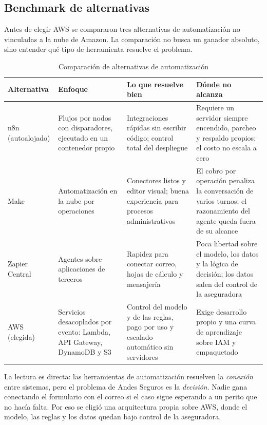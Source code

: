 \documentclass[12pt,letterpaper]{article}
\begin{document}
\subsection{Benchmark de alternativas}

Antes de elegir AWS se compararon tres alternativas de automatización no vinculadas a la
nube de Amazon. La comparación no busca un ganador absoluto, sino entender qué tipo de
herramienta resuelve el problema.

\begin{table}[H]
\centering
\caption{Comparación de alternativas de automatización}
\label{tab:benchmark}
\small
\begin{tabular}{p{2.5cm}p{3.4cm}p{3.6cm}p{4.2cm}}
\toprule
\textbf{Alternativa} & \textbf{Enfoque} & \textbf{Lo que resuelve bien} & \textbf{Dónde no alcanza} \\
\midrule
n8n (autoalojado) &
Flujos por nodos con disparadores, ejecutado en un contenedor propio &
Integraciones rápidas sin escribir código; control total del despliegue &
Requiere un servidor siempre encendido, parcheo y respaldo propios; el costo no escala a cero \\
\addlinespace
Make &
Automatización en la nube por operaciones &
Conectores listos y editor visual; buena experiencia para procesos administrativos &
El cobro por operación penaliza la conversación de varios turnos; el razonamiento del agente queda fuera de su alcance \\
\addlinespace
Zapier Central &
Agentes sobre aplicaciones de terceros &
Rapidez para conectar correo, hojas de cálculo y mensajería &
Poca libertad sobre el modelo, los datos y la lógica de decisión; los datos salen del control de la aseguradora \\
\addlinespace
AWS (elegida) &
Servicios desacoplados por evento: Lambda, API Gateway, DynamoDB y S3 &
Control del modelo y de las reglas, pago por uso y escalado automático sin servidores &
Exige desarrollo propio y una curva de aprendizaje sobre IAM y empaquetado \\
\bottomrule
\end{tabular}
\end{table}

La lectura es directa: las herramientas de automatización resuelven la \emph{conexión}
entre sistemas, pero el problema de Andes Seguros es la \emph{decisión}. Nadie gana
conectando el formulario con el correo si el caso sigue esperando a un perito que no hacía
falta. Por eso se eligió una arquitectura propia sobre AWS, donde el modelo, las reglas y
los datos quedan bajo control de la aseguradora.
\end{document}
